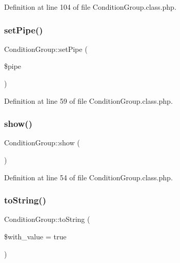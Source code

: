 Definition at line 104 of file Condition\+Group.\+class.\+php.

\mbox{\label{classConditionGroup_aa87eb83d1a7546a3db1cf2faf09a8960}} 
\subsubsection{\texorpdfstring{set\+Pipe()}{setPipe()}}
{\footnotesize\ttfamily Condition\+Group\+::set\+Pipe (\begin{DoxyParamCaption}\item[{}]{\$pipe }\end{DoxyParamCaption})}



Definition at line 59 of file Condition\+Group.\+class.\+php.

\mbox{\label{classConditionGroup_a1c58d26f63d47b3a7b6a221f7dc31fc5}} 
\subsubsection{\texorpdfstring{show()}{show()}}
{\footnotesize\ttfamily Condition\+Group\+::show (\begin{DoxyParamCaption}{ }\end{DoxyParamCaption})}



Definition at line 54 of file Condition\+Group.\+class.\+php.

\mbox{\label{classConditionGroup_a2c5a734221f4f169a394303a0ac446b1}} 
\subsubsection{\texorpdfstring{to\+String()}{toString()}}
{\footnotesize\ttfamily Condition\+Group\+::to\+String (\begin{DoxyParamCaption}\item[{}]{\$with\+\_\+value = {\ttfamily true} }\end{DoxyParamCaption})}

